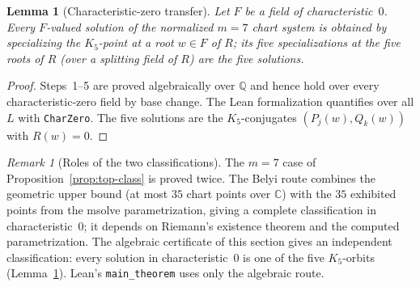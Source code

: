 \documentclass[a4paper,11pt]{article}
\theoremstyle{plain}
\newtheorem{lemma}[theorem]{Lemma}
\theoremstyle{definition}
\theoremstyle{remark}
\newtheorem{remark}[theorem]{Remark}
\begin{document}
\begin{lemma}[Characteristic-zero transfer]\label{lem:chart-transfer}
Let $F$ be a field of characteristic~$0$. Every $F$-valued solution of the normalized $m=7$ chart system is obtained by specializing the $K_5$-point at a root $w\in F$ of $R$; its five specializations at the five roots of $R$ (over a splitting field of $R$) are the five solutions.
\end{lemma}
\begin{proof}
Steps~1--5 are proved algebraically over $\mathbb{Q}$ and hence hold over every characteristic-zero field by base change. The Lean formalization quantifies over all $L$ with \texttt{CharZero}. The five solutions are the $K_5$-conjugates $(P_j(w),Q_k(w))$ with $R(w)=0$.
\end{proof}

\begin{remark}[Roles of the two classifications]
The $m=7$ case of Proposition~\ref{prop:top-class} is proved twice. The Belyi route combines the geometric upper bound (at most $35$ chart points over $\mathbb{C}$) with the $35$ exhibited points from the msolve parametrization, giving a complete classification in characteristic~$0$; it depends on Riemann's existence theorem and the computed parametrization. The algebraic certificate of this section gives an independent classification: every solution in characteristic~$0$ is one of the five $K_5$-orbits (Lemma~\ref{lem:chart-transfer}). Lean's \texttt{main\_theorem} uses only the algebraic route.
\end{remark}
\end{document}

